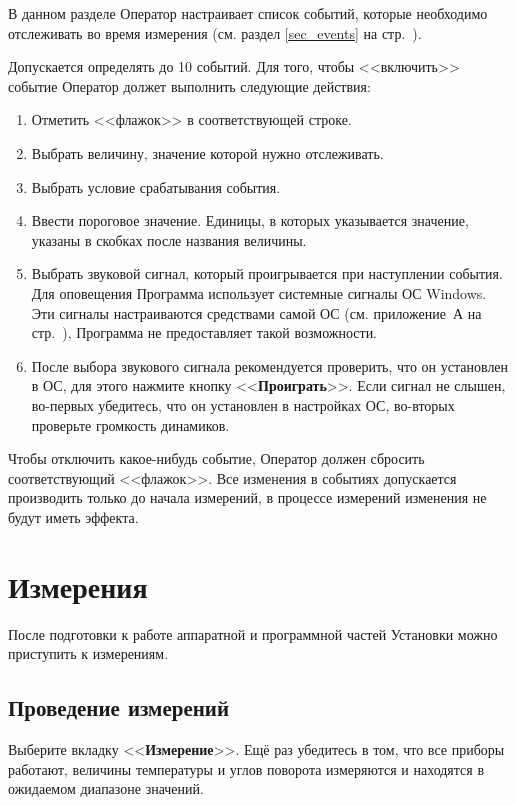 \documentclass[12pt, a4paper, twocolumn]{report}
\newcommand{\CTL}[1]{<<{\bf #1}>>}
\begin{document}
В данном разделе Оператор настраивает список событий, которые необходимо отслеживать во время измерения (см. раздел \ref{sec_events} на стр.~\pageref{sec_events}).

Допускается определять до 10 событий. Для того, чтобы <<включить>> событие Оператор должет выполнить следующие действия:

\begin{enumerate}
\item Отметить <<флажок>> в соответствующей строке.
\item Выбрать величину, значение которой нужно отслеживать.
\item Выбрать условие срабатывания события.
\item Ввести пороговое значение. Единицы, в которых указывается значение, указаны в скобках после названия величины.
\item Выбрать звуковой сигнал, который проигрывается при наступлении события. Для оповещения Программа использует системные сигналы ОС Windows. Эти сигналы настраиваются средствами самой ОС (см. приложение~А на стр.~\pageref{sec_system_sounds}), Программа не предоставляет такой возможности.
\item После выбора звукового сигнала рекомендуется проверить, что он установлен в ОС, для этого нажмите кнопку \CTL{Проиграть}. Если сигнал не слышен, во-первых убедитесь, что он установлен в настройках ОС, во-вторых проверьте громкость динамиков.
\end{enumerate}

Чтобы отключить какое-нибудь событие, Оператор должен сбросить соответствующий <<флажок>>. Все изменения в событиях допускается производить только до начала измерений, в процессе измерений изменения не будут иметь эффекта.

\chapter{Измерения}

После подготовки к работе аппаратной и программной частей Установки можно приступить к измерениям.

\section{Проведение измерений}

Выберите вкладку \CTL{Измерение}. Ещё раз убедитесь в том, что все приборы работают, величины температуры и углов поворота  измеряются и находятся в ожидаемом диапазоне значений.
\end{document}
